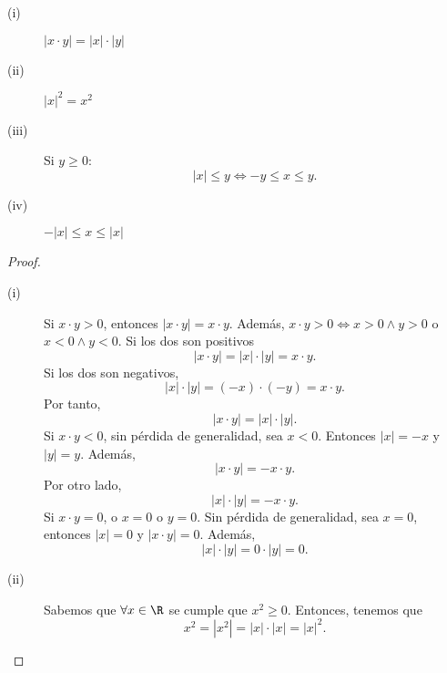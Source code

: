 \begin{fprop}[]
\normalfont 
\begin{description}
\item[(i)] $\displaystyle \left|x \cdot y\right| = \left|x\right| \cdot \left|y\right| $ 
\item[(ii)] $\displaystyle \left|x\right|^{2} = x^{2} $ 
\item[(iii)] Si $\displaystyle y \geq 0 $:
	\[ \left|x\right|\leq y \iff -y \leq x \leq y .\]
\item[(iv)] $\displaystyle - \left|x\right|\leq x \leq \left|x\right| $ 
\end{description}
\end{fprop}
 \begin{proof}
 \begin{description}
 \item[(i)] Si $\displaystyle x \cdot y>0 $, entonces $\displaystyle \left|x \cdot y\right| = x \cdot y $. Además, $\displaystyle x \cdot y > 0 \iff x>0 \land y >0 $ o $\displaystyle x < 0 \land y <0$. Si los dos son positivos
	 \[ \left|x \cdot y\right| = \left|x\right| \cdot \left|y\right| = x \cdot y .\]
Si los dos son negativos, 
\[|x| \cdot \left|y\right| =\left(-x\right) \cdot \left(- y\right) = x \cdot y .\]
Por tanto, 
\[|x \cdot y|= \left|x\right| \cdot \left|y\right| .\]
Si $\displaystyle x \cdot y<0 $, sin pérdida de generalidad, sea $\displaystyle x<0 $. Entonces $\displaystyle \left|x\right| = -x $ y $\displaystyle \left|y\right| = y $. Además, 
\[ \left|x \cdot y\right| = - x \cdot y .\]
Por otro lado, 
\[ \left|x\right| \cdot \left|y\right| = - x \cdot y .\]
Si $\displaystyle x \cdot y = 0 $, o $\displaystyle x = 0$ o $\displaystyle y = 0 $. Sin pérdida de generalidad, sea $\displaystyle x = 0 $, entonces $\displaystyle \left|x\right|=0 $ y $\displaystyle |x \cdot y| = 0 $. 
Además, 
\[|x| \cdot \left|y\right| = 0 \cdot \left|y\right| = 0 .\]
\item[(ii)] Sabemos que $\displaystyle \forall x \in \R $ se cumple que $\displaystyle x^{2}\geq0$. Entonces, tenemos que 
	\[x^{2} = \left|x^{2}\right| = \left|x\right| \cdot \left|x\right| = \left|x\right|^{2} .\]
	

\end{description}
\end{proof}
